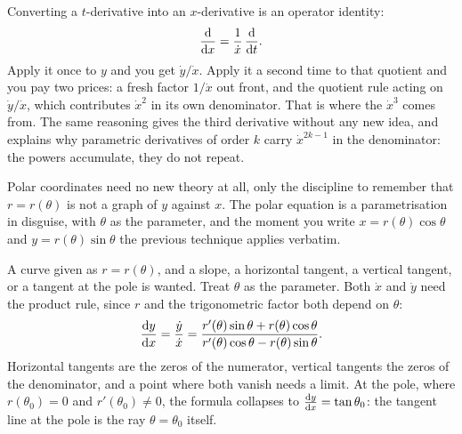 \begin{keynote}
Converting a $t$-derivative into an $x$-derivative is an operator identity:
\[
\frac{\mathrm{d}}{\mathrm{d}x}=\frac{1}{\dot x}\,\frac{\mathrm{d}}{\mathrm{d}t}.
\]
Apply it once to $y$ and you get $\dot y/\dot x$. Apply it a second time to that quotient and you pay two prices: a fresh factor $1/\dot x$ out front, and the quotient rule acting on $\dot y/\dot x$, which contributes $\dot x^{2}$ in its own denominator. That is where the $\dot x^{3}$ comes from. The same reasoning gives the third derivative without any new idea, and explains why parametric derivatives of order $k$ carry $\dot x^{2k-1}$ in the denominator: the powers accumulate, they do not repeat.
\end{keynote}

Polar coordinates need no new theory at all, only the discipline to remember that $r=r(\theta)$ is not a graph of $y$ against $x$. The polar equation is a parametrisation in disguise, with $\theta$ as the parameter, and the moment you write $x=r(\theta)\cos\theta$ and $y=r(\theta)\sin\theta$ the previous technique applies verbatim.

\cue A curve given as $r=r(\theta)$, and a slope, a horizontal tangent, a vertical tangent, or a tangent at the pole is wanted.
\method Treat $\theta$ as the parameter. Both $\dot x$ and $\dot y$ need the product rule, since $r$ and the trigonometric factor both depend on $\theta$:
\[
\frac{\mathrm{d}y}{\mathrm{d}x}=\frac{\dot y}{\dot x}=\frac{r'(\theta)\sin\theta+r(\theta)\cos\theta}{r'(\theta)\cos\theta-r(\theta)\sin\theta} .
\]
Horizontal tangents are the zeros of the numerator, vertical tangents the zeros of the denominator, and a point where both vanish needs a limit. At the pole, where $r(\theta_{0})=0$ and $r'(\theta_{0})\neq0$, the formula collapses to $\frac{\mathrm{d}y}{\mathrm{d}x}=\tan\theta_{0}$: the tangent line at the pole is the ray $\theta=\theta_{0}$ itself.

